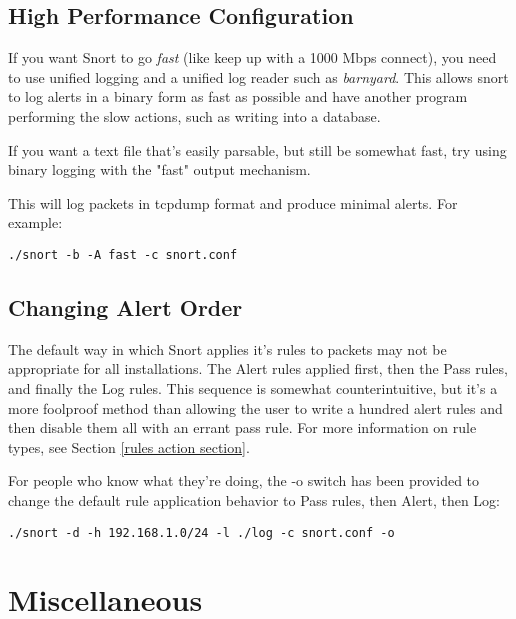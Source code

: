 \documentclass[english]{report}
\begin{document}
\subsection{High Performance Configuration}

If you want Snort to go \emph{fast} (like keep up with a 1000 Mbps connect), you need to use unified logging and a unified log reader such as \emph{barnyard}.  This allows snort to log alerts in a binary form as fast as possible and have another program performing the slow actions, such as writing into a database.

If you want a text file that's easily parsable, but still be somewhat fast, try using binary logging with the "fast" output mechanism. 

This will log packets in tcpdump format and produce minimal alerts. For example:

\begin{center}
\begin{verbatim}
./snort -b -A fast -c snort.conf
\end{verbatim}
\end{center}

\subsection{Changing Alert Order}

The default way in which Snort applies it's rules to packets may not be
appropriate for all installations.  The Alert rules applied first, then the
Pass rules, and finally the Log rules. This sequence is somewhat
counterintuitive, but it's a more foolproof method than allowing the user to
write a hundred alert rules and then disable them all with an errant pass rule.
For more information on rule types, see Section \ref{rules action section}.

For people who know what they're doing, the -o switch has been provided to
change the default rule application behavior to Pass rules, then Alert, then
Log:
\begin{center}
\begin{verbatim}
./snort -d -h 192.168.1.0/24 -l ./log -c snort.conf -o
\end{verbatim}
\end{center}

\section{Miscellaneous}
\end{document}
